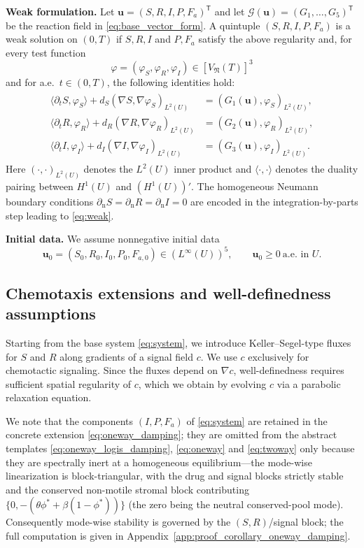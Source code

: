 \documentclass[pdflatex,sn-mathphys-ay]{sn-jnl}
\theoremstyle{thmstyleone}
\theoremstyle{definition}
\theoremstyle{remark}
\begin{document}
\medskip
\noindent\textbf{Weak formulation.}
Let $\mathbf u=(S,R,I,P,F_a)^{\mathsf T}$ and let $\mathcal G(\mathbf u)=(G_1,\dots,G_5)^{\mathsf T}$ be the reaction field in \eqref{eq:base_vector_form}. 
A quintuple $(S,R,I,P,F_a)$ is a weak solution on $(0,T)$ if $S,R,I$ and $P,F_a$ satisfy the above regularity and, for every test function
\[
\varphi=(\varphi_S,\varphi_R,\varphi_I)\in [V_{\mathfrak N}(T)]^3
\]
and for a.e.\ $t\in(0,T)$, the following identities hold:
\begin{align}
\label{eq:weak}
\begin{aligned}
\langle \partial_t S,\varphi_S\rangle + d_S(\nabla S,\nabla\varphi_S)_{L^2(U)} &= (G_1(\mathbf{u}),\varphi_S)_{L^2(U)},\\
\langle \partial_t R,\varphi_R\rangle + d_R(\nabla R,\nabla\varphi_R)_{L^2(U)} &= (G_2(\mathbf{u}),\varphi_R)_{L^2(U)},\\
\langle \partial_t I,\varphi_I\rangle + d_I(\nabla I,\nabla\varphi_I)_{L^2(U)} &= (G_3(\mathbf{u}),\varphi_I)_{L^2(U)}.
\end{aligned}
\end{align}
Here $(\cdot,\cdot)_{L^2(U)}$ denotes the $L^2(U)$ inner product and $\langle\cdot,\cdot\rangle$ denotes the duality pairing between $H^1(U)$ and $(H^1(U))'$. 
The homogeneous Neumann boundary conditions $\partial_{\mathrm n}S=\partial_{\mathrm n}R=\partial_{\mathrm n}I=0$ are encoded in the integration-by-parts step leading to \eqref{eq:weak}.

\medskip
\noindent\textbf{Initial data.}
We assume nonnegative initial data
\[
\mathbf u_0=(S_0,R_0,I_0,P_0,F_{a,0})\in (L^\infty(U))^5,
\qquad \mathbf u_0\ge 0\ \text{a.e.\ in }U.
\]

\subsection{Chemotaxis extensions and well-definedness assumptions}
\label{subsec:chemotaxis_models}

Starting from the base system \eqref{eq:system}, we introduce Keller--Segel-type fluxes for $S$ and $R$ along gradients of a signal field $c$. 
We use $c$ exclusively for chemotactic signaling. 
Since the fluxes depend on $\nabla c$, well-definedness requires sufficient spatial regularity of $c$, which we obtain by evolving $c$ via a parabolic relaxation equation.

We note that the components $(I,P,F_a)$ of \eqref{eq:system} are retained in the
concrete extension \eqref{eq:oneway_damping}; they are omitted from the abstract
templates \eqref{eq:oneway_logis_damping}, \eqref{eq:oneway} and \eqref{eq:twoway} only because they are spectrally inert at a homogeneous equilibrium---the mode-wise
linearization is block-triangular, with the drug and signal blocks strictly
stable and the conserved non-motile stromal block contributing $\{0,
-(\theta\phi^*+\beta(1-\phi^*))\}$ (the zero being the neutral conserved-pool
mode). Consequently mode-wise stability is governed by the $(S,R)$/signal block;
the full computation is given in Appendix~\ref{app:proof_corollary_oneway_damping}.
\end{document}
